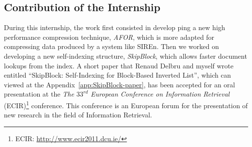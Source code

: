 \subsection{Contribution of the Internship}

During this internship, the work first consisted in develop ping a new high
performance compression technique, \emph{AFOR}, which is more adapted for
compressing data produced by a system like SIREn. Then we worked on developing
a new self-indexing structure, \emph{SkipBlock}, which allows faster document
lookups from the index. A short paper that Renaud Delbru and myself wrote
entitled ``SkipBlock: Self-Indexing for Block-Based Inverted List'', which can
viewed at the Appendix~\ref{app:SkipBlock-paper}, has been accepted for an oral
presentation at the \emph{The $33^{rd}$ European
Conference on Information Retrieval} (ECIR)\footnote{ECIR:
\url{http://www.ecir2011.dcu.ie/}} conference. This conference is an European
forum for the presentation of new research in the field of Information
Retrieval.
